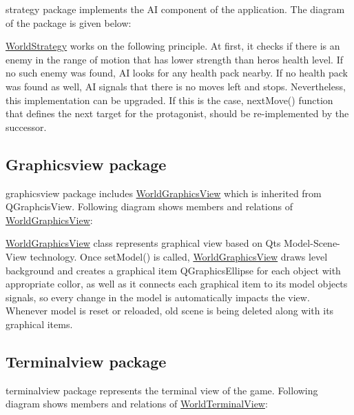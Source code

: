 {\ttfamily strategy} package implements the AI component of the application. The diagram of the package is given below\+:



{\ttfamily \hyperlink{classWorldStrategy}{World\+Strategy}} works on the following principle. At first, it checks if there is an enemy in the range of motion that has lower strength than hero\textquotesingle{}s health level. If no such enemy was found, AI looks for any health pack nearby. If no health pack was found as well, AI signals that there is no moves left and stops. Nevertheless, this implementation can be upgraded. If this is the case, {\ttfamily next\+Move()} function that defines the next target for the protagonist, should be re-\/implemented by the successor.

\subsection*{Graphicsview package}

{\ttfamily graphicsview} package includes {\ttfamily \hyperlink{classWorldGraphicsView}{World\+Graphics\+View}} which is inherited from {\ttfamily Q\+Graphcis\+View}. Following diagram shows members and relations of {\ttfamily \hyperlink{classWorldGraphicsView}{World\+Graphics\+View}}\+:



{\ttfamily \hyperlink{classWorldGraphicsView}{World\+Graphics\+View}} class represents graphical view based on Qt\textquotesingle{}s Model-\/\+Scene-\/\+View technology. Once {\ttfamily set\+Model()} is called, {\ttfamily \hyperlink{classWorldGraphicsView}{World\+Graphics\+View}} draws level background and creates a graphical item {\ttfamily Q\+Graphics\+Ellipse} for each object with appropriate collor, as well as it connects each graphical item to its model object\textquotesingle{}s signals, so every change in the model is automatically impacts the view. Whenever model is reset or reloaded, old scene is being deleted along with its graphical items.

\subsection*{Terminalview package}

{\ttfamily terminalview} package represents the terminal view of the game. Following diagram shows members and relations of {\ttfamily \hyperlink{classWorldTerminalView}{World\+Terminal\+View}}\+:



